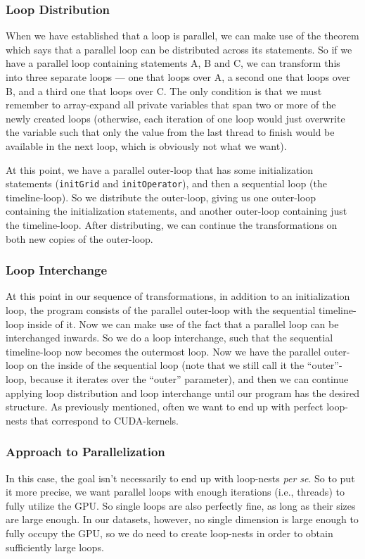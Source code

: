 \documentclass[11pt]{article}
\begin{document}
\subsubsection{Loop Distribution}
When we have established that a loop is parallel, we can make use of the theorem which says that a parallel loop can be distributed across its statements.
So if we have a parallel loop containing statements A, B and C, we can transform this into three separate loops ---
one that loops over A, a second one that loops over B, and a third one that loops over C.
The only condition is that we must remember to array-expand all private variables that span two or more of the newly created loops (otherwise, each iteration of one loop would just overwrite the variable such that only the value from the last thread to finish would be available in the next loop, which is obviously not what we want).

At this point, we have a parallel outer-loop that has some initialization statements (\texttt{initGrid} and \texttt{initOperator}), and then a sequential loop (the timeline-loop).
So we distribute the outer-loop, giving us one outer-loop containing the initialization statements, and another outer-loop containing just the timeline-loop.
After distributing, we can continue the transformations on both new copies of the outer-loop.


\subsubsection{Loop Interchange}
At this point in our sequence of transformations, in addition to an initialization loop, the program consists of the parallel outer-loop with the sequential timeline-loop inside of it.
Now we can make use of the fact that a parallel loop can be interchanged inwards.
So we do a loop interchange, such that the sequential timeline-loop now becomes the outermost loop.
Now we have the parallel outer-loop on the inside of the sequential loop (note that we still call it the ``outer''-loop, because it iterates over the ``outer'' parameter), and then we can continue applying loop distribution and loop interchange until our program has the desired structure.
As previously mentioned, often we want to end up with perfect loop-nests that correspond to CUDA-kernels.

\subsubsection{Approach to Parallelization}
\label{sec:approach}
In this case, the goal isn't necessarily to end up with loop-nests \emph{per se}. So to put it more precise, we want parallel loops with enough iterations (i.e., threads) to fully utilize the GPU.
So single loops are also perfectly fine, as long as their sizes are large enough.
In our datasets, however, no single dimension is large enough to fully occupy the GPU, so we do need to create loop-nests in order to obtain sufficiently large loops.
\end{document}
